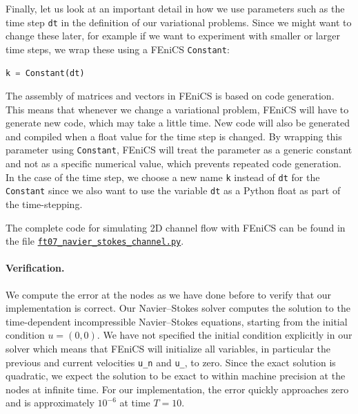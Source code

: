 \documentclass[graybox,envcountchap,sectrefs,final]{svmonodo}
\begin{document}
Finally, let us look at an important detail in how we use parameters
such as the time step \texttt{dt} in the definition of our variational
problems. Since we might want to change these later, for example if we
want to experiment with smaller or larger time steps, we wrap these
using a FEniCS \texttt{Constant}:

\begin{lstlisting}[language=Python,style=graycolor]
k = Constant(dt)
\end{lstlisting}

The assembly of matrices and vectors in FEniCS is based on code
generation. This means that whenever we change a variational problem,
FEniCS will have to generate new code, which may take a little
time. New code will also be generated and compiled when a float value
for the time step is changed. By wrapping this parameter using
\texttt{Constant}, FEniCS will treat the parameter as a generic constant and
not as a specific numerical value, which prevents repeated code
generation. In the case of the time step, we choose a new name \texttt{k}
instead of \texttt{dt} for the \texttt{Constant} since we also want to use the
variable \texttt{dt} as a Python float as part of the time-stepping.

The complete code for simulating 2D channel flow with FEniCS
can be found in the file \href{{https://fenicsproject.org/pub/tutorial/python/vol1/ft07_navier_stokes_channel.py}}{\nolinkurl{ft07_navier_stokes_channel.py}}.


\paragraph{Verification.}

We compute the error at the nodes as we have done before to verify
that our implementation is correct. Our Navier--Stokes solver computes
the solution to the time-dependent incompressible Navier--Stokes
equations, starting from the initial condition $u = (0, 0)$. We have
not specified the initial condition explicitly in our solver which
means that FEniCS will initialize all variables, in particular the
previous and current velocities \Verb!u_n! and \Verb!u_!, to zero. Since the
exact solution is quadratic, we expect the solution to be exact to
within machine precision at the nodes at infinite time. For our
implementation, the error quickly approaches zero and is approximately
$10^{-6}$ at time $T = 10$.
\end{document}
